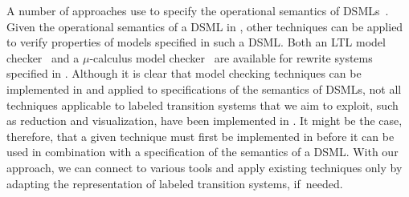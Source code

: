 A number of approaches use \Maude to specify the operational semantics of DSMLs~\cite{Rusu:2011:EDM:1921532.1921557, Rivera:2009:FSA:1631662.1631666}.
Given the operational semantics of a DSML in \Maude, other techniques can be applied to verify properties of models specified in such a DSML.
Both an LTL model checker~\cite{wrla2002:mmc} and a $\mu$-calculus model checker~\cite{Wang:2005:9MC:1705545.1705992} are available for rewrite systems specified in \Maude.
Although it is clear that model checking techniques can be implemented in \Maude and applied to specifications of the semantics of DSMLs, not all techniques applicable to labeled transition systems that we aim to exploit, such as reduction and visualization, have been implemented in \Maude.
It might be the case, therefore, that a given technique must first be implemented in \Maude before it can be used in combination with a specification of the semantics of a DSML.
With our approach, we can connect to various tools and apply existing techniques only by adapting the representation of labeled transition systems, if~needed. 